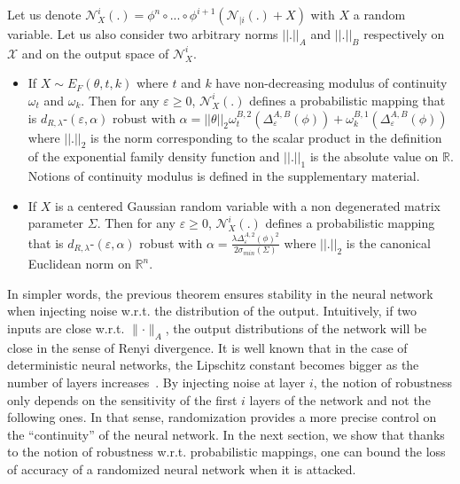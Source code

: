 \begin{thm}
\label{thm:netrob}
Let us denote $\mathcal{N}_{X}^i(.)=\phi^n\circ...\circ\phi^{i+1}(\mathcal{N}_{|i}(.)+X)$ with $X$ a random variable. Let us also consider two arbitrary norms $||.||_{A}$ and $||.||_{B}$  respectively on $\mathcal{X}$ and on the output space of $\mathcal{N}_{X}^i$.




\begin{itemize}
    \item If $X\sim E_{F}(\theta,t,k)$  where $t$ and $k$ have non-decreasing modulus of continuity $\omega_t$ and $\omega_k$. Then for any $\varepsilon \geq 0$, $\mathcal{N}_{X}^i(.)$ defines a probabilistic mapping that is $d_{R,\lambda}$-$(\varepsilon,\alpha)$ robust with $\alpha = ||\theta||_2 \omega^{B,2}_t(\Delta^{A,B}_{\varepsilon}(\phi)) +\omega_k^{B,1}(\Delta^{A,B}_{\varepsilon}(\phi)) $ where $||.||_2$ is the norm corresponding to the scalar product in the definition of the exponential family density function and $||.||_1$ is the absolute value on $\mathbb{R}$. Notions of continuity modulus is defined in the supplementary material.
    
\item If $X$ is a centered Gaussian random variable with a non degenerated matrix parameter $\Sigma$. Then for any $\varepsilon \geq 0$, $\mathcal{N}_{X}^i(.)$ defines a probabilistic mapping that is $d_{R,\lambda}$-$(\varepsilon,\alpha)$ robust
with $ \alpha = \frac{\lambda \Delta^{A,2}_{\varepsilon}(\phi)^2 }{2 \sigma_{min}(\Sigma) } $ where $||.||_2$ is the canonical Euclidean norm on $\mathbb{R}^n$.
\end{itemize}
\end{thm}

In simpler words, the previous theorem ensures stability in the neural network when injecting noise w.r.t. the distribution of the output. Intuitively, if two inputs are close w.r.t. $\lVert\cdot\rVert_{A}$, the output distributions of the network will be close in the sense of Renyi divergence. It is well known that in the case of deterministic neural networks, the Lipschitz constant becomes bigger as the number of layers increases~\citep{gouk2018regularisation}. By injecting noise at layer $i$, the notion of robustness only depends on the sensitivity of the first $i$ layers of the network and not the following ones. In that sense, randomization provides a more precise control on the ``continuity'' of the neural network. In the next section, we show that thanks to the notion of robustness w.r.t. probabilistic mappings, one can bound the loss of accuracy of a randomized neural network when it is attacked. 

